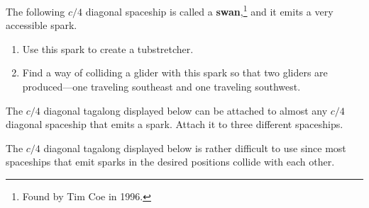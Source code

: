 \begin{multicols}{2}
	
	\mfilbreak
	
	
	\begin{problemstar}\label{exer:swan_tubstretcher} 
		The following $c/4$ diagonal spaceship is called a \textbf{swan},\footnote{Found by Tim Coe in 1996.} and it emits a very accessible spark.
		
		\begin{center}
		\end{center}
		
		\begin{enumerate}[label=\bf\color{ocre}(\alph*)]
			\item Use this spark to create a tubstretcher.
			
			\item Find a way of colliding a glider with this spark so that two gliders are produced---one traveling southeast and one traveling southwest.
		\end{enumerate}
	\end{problemstar}
	
	
	\mfilbreak
	
	
	\begin{problem}\label{exer:c4_diagonal_tagalong} 
		The $c/4$ diagonal tagalong displayed below can be attached to almost any $c/4$ diagonal spaceship that emits a spark. Attach it to three different spaceships.
		
		\begin{center}
		\end{center}
	\end{problem}
	
	
	\mfilbreak
	
	
	\begin{problem}\label{exer:c4_diagonal_glider_emulator} 
		The $c/4$ diagonal tagalong displayed below is rather difficult to use since most spaceships that emit sparks in the desired positions collide with each other.
		
		\begin{center}
		\end{center}
		

\end{problem}
\end{multicols}
